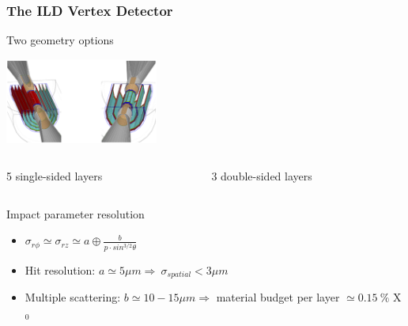 \documentclass{beamer}
\begin{document}
  
  \begin{frame}[label=vxd]
    \frametitle{The ILD Vertex Detector}

    \vspace{-0.3cm}
    \begin{block}{Two geometry options}
      \begin{center}
        \includegraphics[width = 6 cm,height = 2.8cm]{Pictures/ild_VXD.png}
      \end{center}
      \vspace{-0.5cm}
      \begin{columns}[t]
        \begin{column}{5cm}
          5 single-sided layers
        \end{column}
        \begin{column}{5cm}
          3 double-sided layers
        \end{column}
      \end{columns}
    \end{block}

    \vspace{-0.2cm}
    \begin{alertblock}{Impact parameter resolution}
        \begin{itemize}
            \item $\sigma_{r\phi} \simeq \sigma_{rz} \simeq a \oplus \frac{b}{p \cdot sin^{3/2} \theta}$
            \item Hit resolution: $a \simeq 5 \mu m \Rightarrow ~ \sigma_{spatial} < 3 \mu m$
            \item Multiple scattering: $b \simeq 10 - 15 \mu m \Rightarrow$ material budget per layer $\simeq 0.15~\%$ X$_0$ 
        \end{itemize}

    \end{alertblock}



\end{frame}
\end{document}
